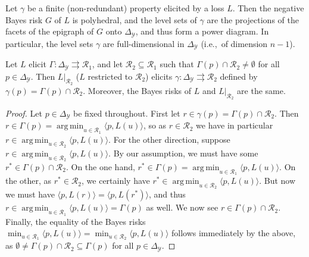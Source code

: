 \documentclass[anon,12pt]{colt2019}
\newcommand{\simplex}{\Delta_\Y}
\newcommand{\R}{\mathcal{R}}
\newcommand{\Y}{\mathcal{Y}}
\newcommand{\inprod}[2]{\langle #1, #2 \rangle}%
\newcommand{\toto}{\rightrightarrows}
\DeclareMathOperator*{\argmin}{arg\,min}
\begin{document}
\begin{lemma}\label{lem:finite-full-dim}
  Let $\gamma$ be a finite (non-redundant) property elicited by a loss $L$.
  Then the negative Bayes risk $G$ of $L$ is polyhedral, and the level sets of $\gamma$ are the projections of the facets of the epigraph of $G$ onto $\simplex$, and thus form a power diagram.
  In particular, the level sets $\gamma$ are full-dimensional in $\simplex$ (i.e.,\ of dimension $n-1$).
\end{lemma}

\begin{lemma}\label{lem:loss-restrict}
  Let $L$ elicit $\Gamma:\simplex\toto\R_1$, and let $\R_2\subseteq\R_1$ such that $\Gamma(p) \cap \R_2 \neq \emptyset$ for all $p\in\simplex$.
  Then $L|_{\R_2}$ ($L$ restricted to $\R_2$) elicits $\gamma:\simplex\toto\R_2$ defined by $\gamma(p) = \Gamma(p)\cap \R_2$.
  Moreover, the Bayes risks of $L$ and $L|_{\R_2}$ are the same.
\end{lemma}
\begin{proof}
  Let $p\in\simplex$ be fixed throughout.
  First let $r \in \gamma(p) = \Gamma(p) \cap \R_2$.
  Then $r \in \Gamma(p) = \argmin_{u\in\R_1} \inprod{p}{L(u)}$, so as $r\in\R_2$ we have in particular $r \in \argmin_{u\in\R_2} \inprod{p}{L(u)}$.
  For the other direction, suppose $r \in \argmin_{u\in\R_2} \inprod{p}{L(u)}$.
  By our assumption, we must have some $r^* \in \Gamma(p) \cap \R_2$.
  On the one hand, $r^*\in\Gamma(p) = \argmin_{u\in\R_1} \inprod{p}{L(u)}$.
  On the other, as $r^* \in \R_2$, we certainly have $r^* \in \argmin_{u\in\R_2} \inprod{p}{L(u)}$.
  But now we must have $\inprod{p}{L(r)} = \inprod{p}{L(r^*)}$, and thus $r \in \argmin_{u\in\R_1} \inprod{p}{L(u)} = \Gamma(p)$ as well.
  We now see $r \in \Gamma(p) \cap \R_2$.
  Finally, the equality of the Bayes risks $\min_{u\in\R_1} \inprod{p}{L(u)} = \min_{u\in\R_2} \inprod{p}{L(u)}$ follows immediately by the above, as $\emptyset \neq \Gamma(p)\cap\R_2 \subseteq \Gamma(p)$ for all $p\in\simplex$.
\end{proof}
\end{document}
